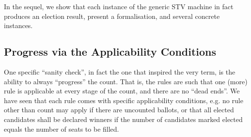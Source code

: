 \documentclass{llncs}
\begin{document}

\noindent
In the sequel, we show that each instance of the generic STV machine
in fact produces an election result, present a formalisation, and
several concrete instances.

\subsection{Progress via the  Applicability Conditions}
  

One specific ``sanity check'', in fact the one that 
inspired the very term, is the ability to always 
``progress'' the count. That is, the rules are such that one (more) rule
is applicable at every stage of the count, and there are no ``dead
ends''. We have seen that each rule comes with specific
applicability conditions, e.g. no rule other than count may apply if
there are uncounted ballots, or that all elected candidates shall be
declared winners if the number of candidates marked elected equals
the number of seats to be filled.  
\end{document}
